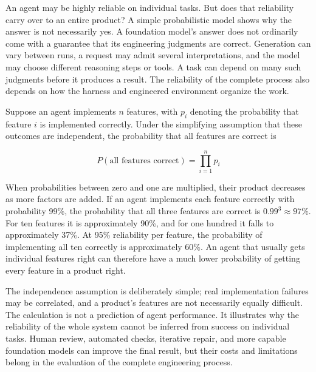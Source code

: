 
An agent may be highly reliable on individual tasks. But does that reliability carry over to an entire product? A simple probabilistic model shows why the answer is not necessarily yes. A foundation model's answer does not ordinarily come with a guarantee that its engineering judgments are correct. Generation can vary between runs, a request may admit several interpretations, and the model may choose different reasoning steps or tools. A task can depend on many such judgments before it produces a result. The reliability of the complete process also depends on how the harness and engineered environment organize the work.


Suppose an agent implements \(n\) features, with \(p_i\) denoting the probability that feature \(i\) is implemented correctly. Under the simplifying assumption that these outcomes are independent, the probability that all features are correct is

\[
P(\text{all features correct})=\prod_{i=1}^{n}p_i
\]

When probabilities between zero and one are multiplied, their product decreases as more factors are added. If an agent implements each feature correctly with probability 99\%, the probability that all three features are correct is \(0.99^3 \approx 97\%\). For ten features it is approximately 90\%, and for one hundred it falls to approximately 37\%. At 95\% reliability per feature, the probability of implementing all ten correctly is approximately 60\%. An agent that usually gets individual features right can therefore have a much lower probability of getting every feature in a product right.

The independence assumption is deliberately simple; real implementation failures may be correlated, and a product's features are not necessarily equally difficult. The calculation is not a prediction of agent performance. It illustrates why the reliability of the whole system cannot be inferred from success on individual tasks. Human review, automated checks, iterative repair, and more capable foundation models can improve the final result, but their costs and limitations belong in the evaluation of the complete engineering process.



